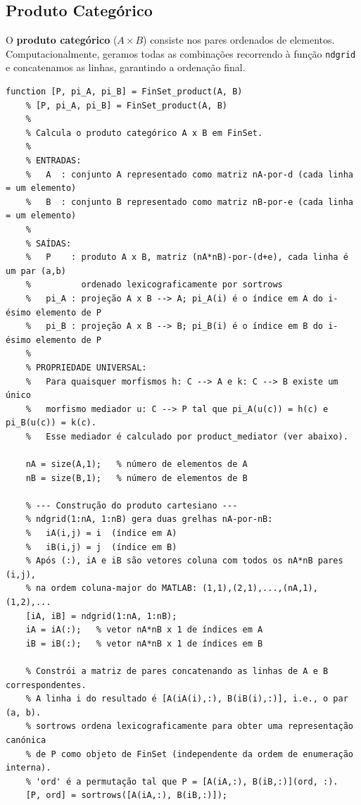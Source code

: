 \subsection{Produto Categórico}

O \textbf{produto categórico} ($A \times B$) consiste nos pares
ordenados de elementos. Computacionalmente, geramos todas as
combinações recorrendo à função \texttt{ndgrid} e concatenamos
as linhas, garantindo a ordenação final.

\begin{lstlisting}[style=matlab, caption={Produto Categórico em FinSet com verificação da propriedade universal}]
	function [P, pi_A, pi_B] = FinSet_product(A, B)
	% [P, pi_A, pi_B] = FinSet_product(A, B)
	%
	% Calcula o produto categórico A x B em FinSet.
	%
	% ENTRADAS:
	%   A  : conjunto A representado como matriz nA-por-d (cada linha = um elemento)
	%   B  : conjunto B representado como matriz nB-por-e (cada linha = um elemento)
	%
	% SAÍDAS:
	%   P    : produto A x B, matriz (nA*nB)-por-(d+e), cada linha é um par (a,b)
	%          ordenado lexicograficamente por sortrows
	%   pi_A : projeção A x B --> A; pi_A(i) é o índice em A do i-ésimo elemento de P
	%   pi_B : projeção A x B --> B; pi_B(i) é o índice em B do i-ésimo elemento de P
	%
	% PROPRIEDADE UNIVERSAL:
	%   Para quaisquer morfismos h: C --> A e k: C --> B existe um único
	%   morfismo mediador u: C --> P tal que pi_A(u(c)) = h(c) e pi_B(u(c)) = k(c).
	%   Esse mediador é calculado por product_mediator (ver abaixo).
	
	nA = size(A,1);   % número de elementos de A
	nB = size(B,1);   % número de elementos de B
	
	% --- Construção do produto cartesiano ---
	% ndgrid(1:nA, 1:nB) gera duas grelhas nA-por-nB:
	%   iA(i,j) = i  (índice em A)
	%   iB(i,j) = j  (índice em B)
	% Após (:), iA e iB são vetores coluna com todos os nA*nB pares (i,j),
	% na ordem coluna-major do MATLAB: (1,1),(2,1),...,(nA,1),(1,2),...
	[iA, iB] = ndgrid(1:nA, 1:nB);
	iA = iA(:);   % vetor nA*nB x 1 de índices em A
	iB = iB(:);   % vetor nA*nB x 1 de índices em B
	
	% Constrói a matriz de pares concatenando as linhas de A e B correspondentes.
	% A linha i do resultado é [A(iA(i),:), B(iB(i),:)], i.e., o par (a, b).
	% sortrows ordena lexicograficamente para obter uma representação canónica
	% de P como objeto de FinSet (independente da ordem de enumeração interna).
	% 'ord' é a permutação tal que P = [A(iA,:), B(iB,:)](ord, :).
	[P, ord] = sortrows([A(iA,:), B(iB,:)]);
	

\end{lstlisting}
